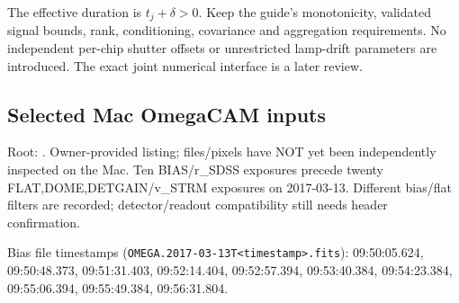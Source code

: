 \documentclass[
  10pt,
  a4paper,
]{article}
\newcommand{\passthrough}[1]{#1}
\begin{document}
The effective duration is \(t_j+\delta>0\). Keep the guide's
monotonicity, validated signal bounds, rank, conditioning, covariance
and aggregation requirements. No independent per-chip shutter offsets or
unrestricted lamp-drift parameters are introduced. The exact joint
numerical interface is a later review.

\hypertarget{selected-mac-omegacam-inputs}{%
\subsection{Selected Mac OmegaCAM
inputs}\label{selected-mac-omegacam-inputs}}

Root: . Owner-provided listing;
files/pixels have NOT yet been independently inspected on the Mac. Ten
BIAS/r\_SDSS exposures precede twenty FLAT,DOME,DETGAIN/v\_STRM
exposures on 2017-03-13. Different bias/flat filters are recorded;
detector/readout compatibility still needs header confirmation.

Bias file timestamps
(\passthrough{\lstinline!OMEGA.2017-03-13T<timestamp>.fits!}):
09:50:05.624, 09:50:48.373, 09:51:31.403, 09:52:14.404, 09:52:57.394,
09:53:40.384, 09:54:23.384, 09:55:06.394, 09:55:49.384, 09:56:31.804.
\end{document}
